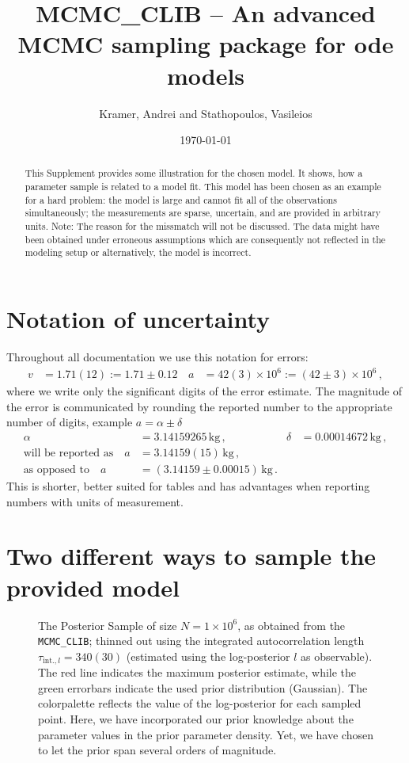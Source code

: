 \documentclass[english]{scrartcl}
\author{Kramer, Andrei and Stathopoulos, Vasileios}
\title{MCMC\_CLIB -- An
advanced MCMC sampling package for ode models}
\date{\today}
\begin{document}
\maketitle
\begin{abstract}
  This Supplement provides some illustration for the chosen model. It
  shows, how a parameter sample is related to a model fit. This model
  has been chosen as an example for a hard problem: the model is large
  and cannot fit all of the observations simultaneously; the
  measurements are sparse, uncertain, and are provided in arbitrary
  units. Note: The reason for the missmatch will not be discussed. The
  data might have been obtained under erroneous assumptions which are
  consequently not reflected in the modeling setup or alternatively,
  the model is incorrect.
\end{abstract}
\section{Notation of uncertainty}
Throughout all documentation we use this notation for errors:
\begin{align}
  \label{eq:errn}
  v&=1.71(12):=1.71 \pm 0.12\, & a&=42(3)\times 10^6:=(42 \pm 3)\times 10^6\,,
\end{align}
where we write only the significant digits of the error estimate. The
magnitude of the error is communicated by rounding the reported number
to the appropriate number of digits, example $a=\alpha \pm \delta$
\begin{align}
  \alpha&=3.14159265\,\text{kg}\,,&\delta&=0.00014672\,\text{kg}\,,\\
  \text{will be reported as}\quad a&=3.14159(15)\,\text{kg}\,,\\
  \text{as opposed to}\quad a&=(3.14159\pm0.00015)\,\text{kg}\,.
\end{align}
This is shorter, better suited for tables and has advantages when
reporting numbers with units of measurement.

\section{Two different ways to sample the provided model}

\begin{figure}
  \hspace*{-1cm}
  
  \caption{The Posterior Sample of size $N=1\times10^6$, as obtained
    from the \texttt{MCMC\_CLIB}; thinned out using the integrated
    autocorrelation length $\tau_{\text{int.},l}=340(30)$ (estimated
    using the log-posterior $l$ as observable). The red line indicates
    the maximum posterior estimate, while the green errorbars indicate
    the used prior distribution (Gaussian). The colorpalette reflects
    the value of the log-posterior for each sampled point.  Here, we
    have incorporated our prior knowledge about the parameter values
    in the prior parameter density. Yet, we have chosen to let the
    prior span several orders of magnitude.\label{fig:pc-sample}}
\end{figure}
\end{document}
